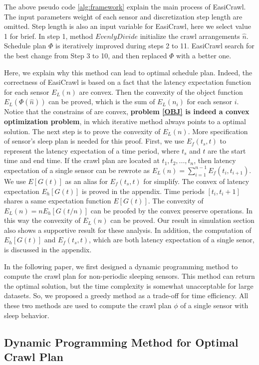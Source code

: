 \documentclass[conference]{IEEEtran}
\begin{document}
The above pseudo code \ref{alg:framework} explain the main process of EasiCrawl. 
The input parameters weight of each sensor and discretization step length are omitted.
Step length is also an input variable for EasiCrawl, here we select value 1 for brief.
In step 1, method $EvenlyDivide$ initialize the crawl arrangements $\hat{n}$. 
Schedule plan $\Phi$ is iteratively improved during steps 2 to 11. 
EasiCrawl search for the best change from Step 3 to 10, and then replaced $\Phi$ with a better one.

Here, we explain why this method can lead to optimal schedule plan.
Indeed, the correctness of EasiCrawl is based on a fact that the latency expectation function for each sensor $E_L(n)$ are convex. 
Then the convexity of the object function $E_L(\Phi(\hat{n}))$ can be proved, which is the sum of $E_L(n_i)$ for each sensor $i$.
Notice that the constrains of are convex, \textbf{problem \eqref{OBJ} is indeed a convex optimization problem}, in which iterative method always points to a optimal solution.
The next step is to prove the convexity of $E_L(n)$.
More specification of sensor's sleep plan is needed for this proof.
First, we use $E_f(t_s,t)$ to represent the latency expectation of a time period, where $t_s$ and $t$ are the start time and end time. If the crawl plan are located at $t_1,t_2,...,t_n$, then latency expectation of a single sensor can be rewrote as $E_L(n) = \sum_{i=1}^{n-1}E_f(t_{i},t_{i+1})$. We use $E[G(t)]$ as an alias for $E_f(t_s,t)$ for simplify.
The convex of latency expectation $E_h[G(t)]$ is proved in the appendix. 
Time periods $[t_i,t_i+1]$ shares a same expectation function $E[G(t)]$. 
The convexity of $E_L(n) = n E_h[G(t/n)]$ can be proofed by the convex preserve operations. 
In this way the convexity of $E_L(n)$ can be proved.
Our result in simulation section also shows a supportive result for these analysis.
In addition, the computation of $E_h[G(t)]$ and $E_f(t_s,t)$, which are both latency expectation of a single senor, is discussed in the appendix.

In the following paper, we first designed a dynamic programming method to compute the crawl plan for non-periodic sleeping sensors. 
This method can return the optimal solution, but the time complexity is somewhat unacceptable for large datasets.
So, we proposed a greedy method as a trade-off for time efficiency. 
All these two methods are used to compute the crawl plan $\phi$ of a single sensor with sleep behavior.

\subsection{Dynamic Programming Method for Optimal Crawl Plan}
\end{document}

